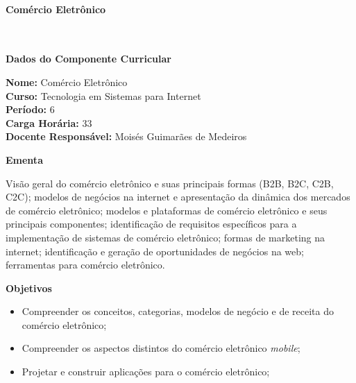 \paragraph{Comércio Eletrônico} \


\begin{snugshade}\begin{center}\textbf{
    Dados do Componente Curricular
}\end{center}\end{snugshade}

\noindent \textbf{Nome:}                Comércio Eletrônico
\\        \textbf{Curso:}               Tecnologia em Sistemas para Internet
\\        \textbf{Período:}             \unit{6}{\degree}
\\        \textbf{Carga Horária:}       \unit{33}{\hour}
\\        \textbf{Docente Responsável:} Moisés Guimarães de Medeiros


\begin{snugshade}\begin{center}\textbf{
    Ementa
\vphantom{q}}\end{center}\end{snugshade}

\noindent
Visão geral do comércio eletrônico e suas principais formas (B2B, B2C, C2B, C2C); modelos de negócios na internet e apresentação da dinâmica dos mercados de comércio eletrônico; modelos e plataformas de comércio eletrônico e seus principais componentes; identificação de requisitos específicos para a implementação de sistemas de comércio eletrônico; formas de marketing na internet; identificação e geração de oportunidades de negócios na web; ferramentas para comércio eletrônico.


\begin{snugshade}\begin{center}\textbf{
    Objetivos
}\end{center}\end{snugshade}

\begin{itemize}

\item Compreender os conceitos, categorias, modelos de negócio e de receita do comércio eletrônico;

\item Compreender os aspectos distintos do comércio eletrônico \textit{mobile};

\item Projetar e construir aplicações para o comércio eletrônico;

\end{itemize}

